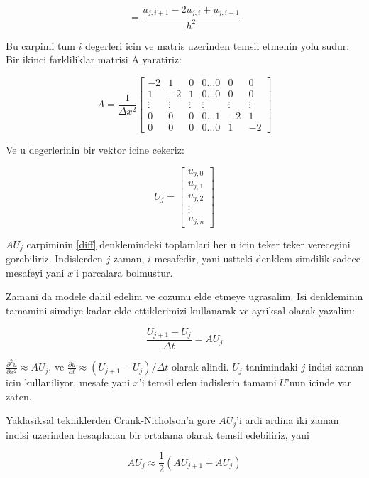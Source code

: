 \documentclass[12pt,fleqn]{article}\usepackage{../common}
\begin{document}
\begin{equation} = \frac{u_{j,i+1}-2u_{j,i}+u_{j,i-1}}{h^2} \label{diff} \end{equation}

Bu carpimi tum $i$ degerleri icin ve matris uzerinden temsil etmenin yolu sudur:
Bir ikinci farkliliklar matrisi A yaratiriz:

\[ 
A = \frac{1}{\Delta x^2}
\left[ \begin{array}{ccccccc}
-2 & 1 & 0 & 0 \ldots 0 & 0 & 0 \\
1 & -2 & 1 & 0 \ldots 0 & 0 & 0 \\
\vdots & \vdots & \vdots & \vdots & \vdots & \vdots \\
0 & 0 & 0 & 0 \ldots 1 & -2 & 1 \\
0 & 0 & 0 & 0 \ldots 0 & 1 & -2
\end{array} \right]
 \]

Ve u degerlerinin bir vektor icine cekeriz:

\[ U_j =
\left[ \begin{array}{c}
u_{j,0} \\
u_{j,1} \\
u_{j,2} \\
\vdots \\
u_{j,n}
\end{array} \right]
 \]

$AU_j$ carpiminin \ref{diff} denklemindeki toplamlari her u icin teker teker
verecegini gorebiliriz. Indislerden $j$ zaman, $i$ mesafedir, yani ustteki
denklem simdilik sadece mesafeyi yani $x$'i parcalara bolmustur.

Zamani da modele dahil edelim ve cozumu elde etmeye ugrasalim. Isi
denkleminin tamamini simdiye kadar elde ettiklerimizi kullanarak ve
ayriksal olarak yazalim:

\begin{equation}
\frac{U_{j+1}-U_j}{\Delta t} = AU_j \label{main}
\end{equation}

$\frac{\partial^2u}{\partial x^2} \approx AU_j$, ve $\frac{\partial
  u}{\partial t} \approx (U_{j+1}-U_j) / \Delta t$ olarak
alindi. $U_j$ tanimindaki $j$ indisi zaman icin kullaniliyor, mesafe
yani $x$'i temsil eden indislerin tamami $U$'nun icinde var zaten.

Yaklasiksal tekniklerden Crank-Nicholson'a gore $AU_j$'i ardi ardina
iki zaman indisi uzerinden hesaplanan bir ortalama olarak temsil
edebiliriz, yani

\[ AU_j \approx \frac{1}{2}(AU_{j+1}+AU_j) \]
\end{document}
